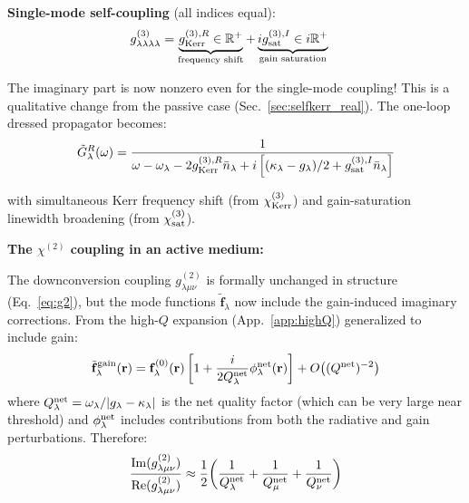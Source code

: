 \documentclass[12pt]{article}
\newcommand{\tf}{\tilde{\mathbf{f}}}
\begin{document}
\textbf{Single-mode self-coupling} (all indices equal):
\begin{align}
  g^{(3)}_{\lambda\lambda\lambda\lambda} &=
  \underbrace{g^{(3),R}_{\rm Kerr}\in\mathbb{R}^+}_{\text{frequency shift}}
  + \underbrace{ig^{(3),I}_{\rm sat}\in i\mathbb{R}^+}_{\text{gain saturation}}
  \label{eq:g3_self_total}
\end{align}

The imaginary part is now nonzero even for the single-mode coupling!
This is a qualitative change from the passive case (Sec.~\ref{sec:selfkerr_real}).
The one-loop dressed propagator becomes:
\begin{equation}
  \tilde{G}^R_\lambda(\omega) = \frac{1}{\omega
  - \omega_\lambda - 2g^{(3),R}_{\rm Kerr}\bar{n}_\lambda
  + i\left[(\kappa_\lambda-g_\lambda)/2
  + g^{(3),I}_{\rm sat}\bar{n}_\lambda\right]}
  \label{eq:dressed_gain_NL}
\end{equation}

with simultaneous Kerr frequency shift (from $\chi^{(3)}_{\rm Kerr}$)
and gain-saturation linewidth broadening (from $\chi^{(3)}_{\rm sat}$).

\textbf{The $\chi^{(2)}$ coupling in an active medium:}

The downconversion coupling $g^{(2)}_{\lambda\mu\nu}$ is formally unchanged
in structure (Eq.~\ref{eq:g2}), but the mode functions $\tf_\lambda$ now
include the gain-induced imaginary corrections.  From the high-$Q$
expansion (App.~\ref{app:highQ}) generalized to include gain:
\begin{equation}
  \tf_\lambda^{\rm gain}(\mathbf{r}) =
  \mathbf{f}^{(0)}_\lambda(\mathbf{r})
  \left[1 + \frac{i}{2Q_\lambda^{\rm net}}\phi_\lambda^{\rm net}(\mathbf{r})\right]
  + O\!\left((Q^{\rm net})^{-2}\right)
  \label{eq:gain_QNM_expansion}
\end{equation}
where $Q_\lambda^{\rm net} = \omega_\lambda/|g_\lambda - \kappa_\lambda|$
is the net quality factor (which can be very large near threshold) and
$\phi_\lambda^{\rm net}$ includes contributions from both the radiative
and gain perturbations.  Therefore:
\begin{equation}
  \frac{\mathrm{Im}(g^{(2)}_{\lambda\mu\nu})}
  {\mathrm{Re}(g^{(2)}_{\lambda\mu\nu})}
  \approx \frac{1}{2}\!\left(\frac{1}{Q_\lambda^{\rm net}}
  +\frac{1}{Q_\mu^{\rm net}}+\frac{1}{Q_\nu^{\rm net}}\right)
  \label{eq:g2_gain_ratio}
\end{equation}
\end{document}
